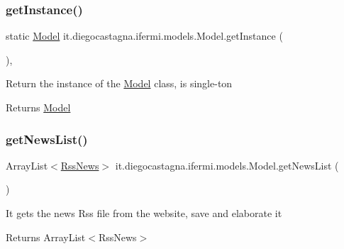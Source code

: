 \subsubsection{\texorpdfstring{getInstance()}{getInstance()}}
{\footnotesize\ttfamily static \mbox{\hyperlink{classit_1_1diegocastagna_1_1ifermi_1_1models_1_1_model}{Model}} it.\+diegocastagna.\+ifermi.\+models.\+Model.\+get\+Instance (\begin{DoxyParamCaption}{ }\end{DoxyParamCaption})\hspace{0.3cm}{\ttfamily [inline]}, {\ttfamily [static]}}

Return the instance of the \mbox{\hyperlink{classit_1_1diegocastagna_1_1ifermi_1_1models_1_1_model}{Model}} class, is single-\/ton \begin{DoxyReturn}{Returns}
\mbox{\hyperlink{classit_1_1diegocastagna_1_1ifermi_1_1models_1_1_model}{Model}} 
\end{DoxyReturn}
\mbox{\label{classit_1_1diegocastagna_1_1ifermi_1_1models_1_1_model_ae307bd31f5052d610605247b793000db}} 
\subsubsection{\texorpdfstring{getNewsList()}{getNewsList()}}
{\footnotesize\ttfamily Array\+List$<$\mbox{\hyperlink{classit_1_1diegocastagna_1_1ifermi_1_1utils_1_1_rss_news}{Rss\+News}}$>$ it.\+diegocastagna.\+ifermi.\+models.\+Model.\+get\+News\+List (\begin{DoxyParamCaption}{ }\end{DoxyParamCaption})\hspace{0.3cm}{\ttfamily [inline]}}

It gets the news Rss file from the website, save and elaborate it \begin{DoxyReturn}{Returns}
Array\+List$<$\+Rss\+News$>$ 
\end{DoxyReturn}
\mbox{\label{classit_1_1diegocastagna_1_1ifermi_1_1models_1_1_model_a6ecb34cb157160253a952c0b2a24811a}} 
